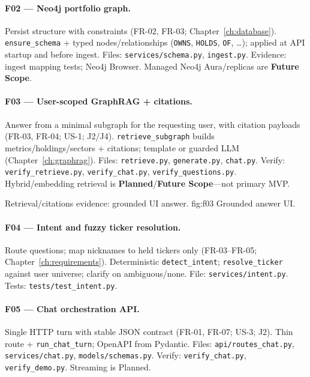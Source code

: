 \paragraph{F02 --- Neo4j portfolio graph.}
Persist structure with constraints (FR-02, FR-03; Chapter~\ref{ch:database}). \texttt{ensure\_schema} + typed nodes/relationships (\texttt{OWNS}, \texttt{HOLDS}, \texttt{OF}, \ldots); applied at API startup and before ingest. Files: \texttt{services/schema.py}, \texttt{ingest.py}. Evidence: ingest mapping tests; Neo4j Browser. Managed Neo4j Aura/replicas are \textbf{Future Scope}.

\paragraph{F03 --- User-scoped GraphRAG + citations.}
Answer from a minimal subgraph for the requesting user, with citation payloads (FR-03, FR-04; US-1; J2/J4). \texttt{retrieve\_subgraph} builds metrics/holdings/sectors + citations; template or guarded LLM (Chapter~\ref{ch:graphrag}). Files: \texttt{retrieve.py}, \texttt{generate.py}, \texttt{chat.py}. Verify: \texttt{verify\_retrieve.py}, \texttt{verify\_chat.py}, \texttt{verify\_questions.py}. Hybrid/embedding retrieval is \textbf{Planned}/\textbf{Future Scope}---not primary MVP.

%
{Retrieval/citations evidence: grounded UI answer.}%
{fig:f03}%
{Grounded answer UI.}

\paragraph{F04 --- Intent and fuzzy ticker resolution.}
Route questions; map nicknames to held tickers only (FR-03--FR-05; Chapter~\ref{ch:requirements}). Deterministic \texttt{detect\_intent}; \texttt{resolve\_ticker} against user universe; clarify on ambiguous/none. File: \texttt{services/intent.py}. Tests: \texttt{tests/test\_intent.py}.

\paragraph{F05 --- Chat orchestration API.}
Single HTTP turn with stable JSON contract (FR-01, FR-07; US-3; J2). Thin route + \texttt{run\_chat\_turn}; OpenAPI from Pydantic. Files: \texttt{api/routes\_chat.py}, \texttt{services/chat.py}, \texttt{models/schemas.py}. Verify: \texttt{verify\_chat.py}, \texttt{verify\_demo.py}. Streaming is Planned.


